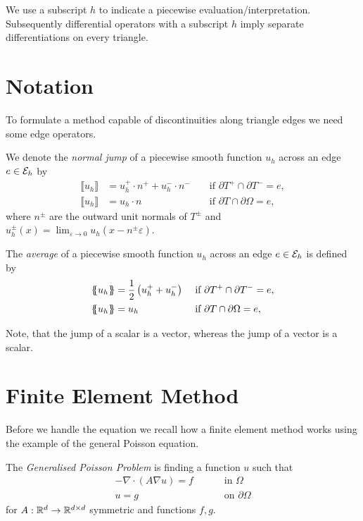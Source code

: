We use a subscript $h$ to indicate a piecewise evaluation/interpretation. Subsequently differential operators with a subscript $h$ imply separate differentiations on every triangle.

\section{Notation}
To formulate a method capable of discontinuities along triangle edges we need some edge operators.   

\begin{definition}
We denote the \emph{normal jump} of  a piecewise smooth function $u_h$ across an edge $e \in \mathcal{E}_h$ by
\begin{align*}
	\llbracket u_h \rrbracket &= u_h^+ \cdot n^+ + u_h^-\cdot n^-  &&\text{ if } \partial T^+ \cap \partial T^- = e, \\
	\llbracket u_h \rrbracket &= u_h \cdot n  &&\text{ if } \partial T \cap \partial \Omega = e,
\end{align*}
where $n^\pm$ are the outward unit normals of $T^\pm$ and  $u_h^\pm(x) = \lim_{\varepsilon \rightarrow 0} u_h(x-n^\pm \varepsilon)$.

The \emph{average} of a piecewise smooth function $u_h$ across an edge $e \in \mathcal{E}_h$ is defined by
\begin{align*}
	\laverage u_h \raverage &= \frac 1 2 \left(u_h^+ + u_h^-\right) &&\text{ if } \partial T^+ \cap \partial T^- = e, \\
	\laverage u_h  \raverage &= u_h &&\text{ if } \partial T \cap \partial \Omega = e,
\end{align*}
\end{definition}

Note, that the jump of a scalar is a vector, whereas the jump of a vector is a scalar.


\section{Finite Element Method}
Before we handle the \MA equation we recall how a finite element method works using the example of the general Poisson equation. 


\begin{definition}
The \emph{Generalised Poisson Problem} is finding a function $u$ such that 
\begin{align}
	-\nabla \cdot (A \nabla u) = f \qquad &\text{ in }\Omega \label{eq: poisson eq} \\
	u = g \qquad &\text{ on } \partial \Omega    \label{eq: poisson bc}
\end{align}
for $ A:\mathbb{R}^d \rightarrow \mathbb{R}^{d \times d}$ symmetric and functions $f,g $. 
\end{definition}

